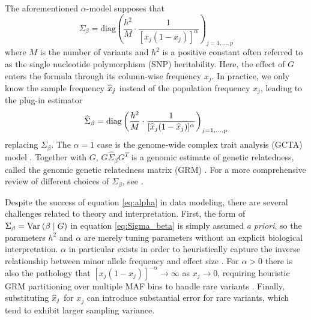\documentclass[10pt]{article}
\begin{document}
The aforementioned $\alpha$-model supposes that
\begin{equation}
    \label{eq:Sigma_beta}
    \Sigma_\beta = \textrm{diag}
    \left( 
    \frac{h^2}{M} \cdot \frac{1}{[x_j(1-x_j)]^\alpha}
    \right)_{j=1,\ldots,p}
\end{equation}
where $M$ is the number of variants and $h^2$ is a positive constant often referred to as the single nucleotide polymorphism (SNP) heritability.
Here, the effect of $G$ enters the formula through its column-wise frequency $x_j$. In practice, we only know the sample frequency $\widehat{x}_j$ instead of the population frequency $x_j$, leading to the plug-in estimator
\begin{align} \label{eq:alpha}
    \begin{aligned}
        \widehat{\Sigma}_{\beta} = \textrm{diag}
        \left( 
        \frac{h^2}{M } \cdot \frac{1}{[\widehat{x}_j(1-\widehat{x}_j)]^\alpha}
        \right)_{j=1,\ldots,p} 
    \end{aligned}
\end{align}
replacing $\Sigma_\beta$.
The $\alpha=1$ case is the genome-wide complex trait analysis (GCTA) model \citep{Yang_2011}.
Together with $G$, $G \widehat{\Sigma}_{\beta}G^T$ is a genomic estimate of genetic relatedness, called the genomic genetic relatedness matrix (GRM) \citep{Speed_2014}.
For a more comprehensive review of different choices of $\Sigma_\beta$, see \citet{Lehmann_2025, Weir_2026}.

Despite the success of equation \eqref{eq:alpha} in data modeling, there are several challenges related to theory and interpretation.
First, the form of $\Sigma_\beta = \mathrm{Var}_{}\left(\beta \mid G\right)$ in equation \eqref{eq:Sigma_beta} is simply assumed \emph{a priori}, so the parameters $h^2$ and $\alpha$ are merely tuning parameters without an explicit biological interpretation. $\alpha$ in particular exists in order to heuristically capture the inverse relationship between minor allele frequency and effect size \citep{Zeng_2018,Schoech_2019}.
For $\alpha>0$ there is also the pathology that $[x_j(1-x_j)]^{-\alpha}\to\infty$  as $x_j\to 0$, requiring heuristic GRM partitioning over multiple MAF bins to handle rare variants \citep{Yang_2015,Wainschtein_2022}.
Finally, substituting $\widehat{x}_j$ for $x_j$ can introduce substantial error for rare variants, which tend to exhibit larger sampling variance.
\end{document}
